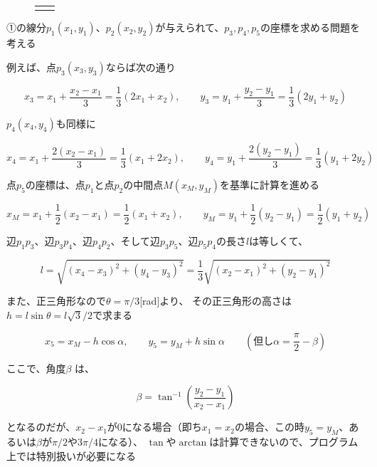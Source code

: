\documentclass[uplatex,a4paper,11pt,oneside,openany]{jsbook}
\begin{document}
\begin{figure}[H]
\begin{tabular}{cc}
\begin{minipage}{0.5\hsize}
      \end{minipage}
    \end{tabular}
\end{figure}%

①の線分$p_1(x_1,y_1)$、$p_2(x_2,y_2)$が与えられて、$p_3,p_4,p_5$の座標を求める問題を考える

例えば、点$p_3(x_3,y_3)$ならば次の通り

\begin{equation}
  x_3 = x_1 + \frac{x_2-x_1}{3} = \frac{1}{3}(2x_1+x_2), \qquad y_3 = y_1 + \frac{y_2-y_1}{3} = \frac{1}{3}(2y_1+y_2)
\end{equation}

$p_4(x_4,y_4)$も同様に

\begin{equation}
  x_4 = x_1 + \frac{2(x_2-x_1)}{3} = \frac{1}{3}(x_1+2x_2), \qquad y_4 = y_1 + \frac{2(y_2-y_1)}{3} = \frac{1}{3}(y_1+2y_2)
\end{equation}

点$p_5$の座標は、点$p_1$と点$p_2$の中間点$M(x_M,y_M)$を基準に計算を進める

\begin{equation*}
  x_M = x_1 + \frac{1}{2}(x_2-x_1)=\frac{1}{2}(x_1+x_2), \qquad　y_M = y_1 + \frac{1}{2}(y_2-y_1)=\frac{1}{2}(y_1+y_2)
\end{equation*}

辺$p_1p_3$、辺$p_3p_4$、辺$p_4p_2$、そして辺$p_3p_5$、辺$p_5p_4$の長さ$l$は等しくて、

\begin{equation*}
    l=\sqrt{(x_4-x_3)^2+(y_4-y_3)^2}=\frac{1}{3}\sqrt{(x_2-x_1)^2+(y_2-y_1)^2}
\end{equation*}

また、正三角形なので$\theta=\pi/3$[rad]より、
その正三角形の高さは$h=l\sin\theta=l\sqrt{3}/2$で求まる

\begin{equation}
  x_5 = x_M-h\cos\alpha, \qquad y_5 = y_M+h\sin\alpha \qquad (但し　\alpha=\frac{\pi}{2}-\beta)
\end{equation}

ここで、角度$\beta$ は、

\begin{equation*}
    \beta=\tan^{-1}\left({\frac{y_2-y_1}{x_2-x_1}}\right)
\end{equation*}

となるのだが、$x_2-x_1$が$0$になる場合（即ち$x_1=x_2$の場合、この時$y_5=y_M$、あるいは$\beta$が$\pi/2$や$3\pi/4$になる）、
$\tan$や$\arctan$は計算できないので、プログラム上では特別扱いが必要になる
\end{document}
